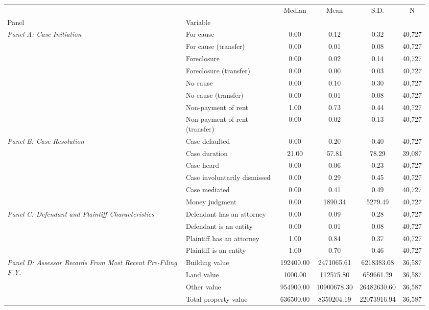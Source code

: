 \begin{tabular}{llcccc}
\toprule
 &  & Median & Mean & S.D. & N \\
Panel & Variable &  &  &  &  \\
\midrule
\multirow[c]{8}{4cm}{\textit{Panel A: Case Initiation}} & For cause & 0.00 & 0.12 & 0.32 & 40,727 \\
 & For cause (transfer) & 0.00 & 0.01 & 0.08 & 40,727 \\
 & Foreclosure & 0.00 & 0.02 & 0.14 & 40,727 \\
 & Foreclosure (transfer) & 0.00 & 0.00 & 0.03 & 40,727 \\
 & No cause & 0.00 & 0.10 & 0.30 & 40,727 \\
 & No cause (transfer) & 0.00 & 0.01 & 0.08 & 40,727 \\
 & Non-payment of rent & 1.00 & 0.73 & 0.44 & 40,727 \\
 & Non-payment of rent (transfer) & 0.00 & 0.02 & 0.13 & 40,727 \\
\cline{1-6}
\multirow[c]{6}{4cm}{\textit{Panel B: Case Resolution}} & Case defaulted & 0.00 & 0.20 & 0.40 & 40,727 \\
 & Case duration & 21.00 & 57.81 & 78.29 & 39,087 \\
 & Case heard & 0.00 & 0.06 & 0.23 & 40,727 \\
 & Case involuntarily dismissed & 0.00 & 0.29 & 0.45 & 40,727 \\
 & Case mediated & 0.00 & 0.41 & 0.49 & 40,727 \\
 & Money judgment & 0.00 & 1890.34 & 5279.49 & 40,727 \\
\cline{1-6}
\multirow[c]{4}{4cm}{\textit{Panel C: Defendant and Plaintiff Characteristics}} & Defendant has an attorney & 0.00 & 0.09 & 0.28 & 40,727 \\
 & Defendant is an entity & 0.00 & 0.01 & 0.08 & 40,727 \\
 & Plaintiff has an attorney & 1.00 & 0.84 & 0.37 & 40,727 \\
 & Plaintiff is an entity & 1.00 & 0.70 & 0.46 & 40,727 \\
\cline{1-6}
\multirow[c]{5}{4cm}{\textit{Panel D: Assessor Records From Most Recent Pre-Filing F.Y.}} & Building value & 192400.00 & 2471065.61 & 6218383.08 & 36,587 \\
 & Land value & 1000.00 & 112575.80 & 659661.29 & 36,587 \\
 & Other value & 954900.00 & 10900678.30 & 26482630.60 & 36,587 \\
 & Total property value & 636500.00 & 8350204.19 & 22073916.94 & 36,587 \\

\end{tabular}
